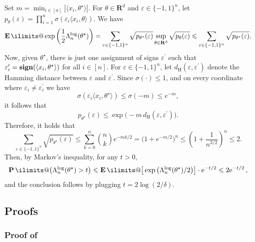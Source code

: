 \documentclass[11pt, letterpaper, hidelinks]{article}
\makeatletter
\renewcommand{\proofname}{\textit{\textbf{Proof}}}
\renewenvironment{proof}[1][\proofname]{\par\pushQED{\qed}\normalfont \topsep6\p@\@plus6\p@\relax\trivlist\item[\hskip\labelsep#1\@addpunct{}]\ignorespaces}{\popQED\endtrivlist\@endpefalse}
\newcommand{\R}{\mathbf R}
\newcommand{\e}{\mathrm{e}}
\DeclareMathOperator{\sign}{\bf sign}
\newcommand{\1}{\mathbf 1}
\newcommand{\eps}{\varepsilon}
\renewcommand{\le}{\leqslant}
\renewcommand{\leq}{\leqslant}
\newcommand{\E}{\operatorname*{\mathbf{E}}\ilimits@}
\renewcommand{\P}{\operatorname*{\mathbf{P}}\ilimits@}
\theoremstyle{plain}
\theoremstyle{definition}
\newcommand{\thetastar}{\theta^\star}
\newcommand{\defn}{=}
\makeatother
\begin{document}
\begin{proof}
Set
$
m \defn \min_{i\in[n]} |\langle x_i,\thetastar\rangle|.
$
For $\theta \in \R^d$ and $\eps \in \{-1,1\}^n$, let
$
p_\theta(\eps)
\defn
\prod_{i=1}^n \sigma(\eps_i \langle x_i,\theta\rangle).
$
We have
\[
\E\exp\left(\frac{1}{2}\Lambda_n^{\operatorname{log}}(\thetastar)\right)
=
\sum_{\varepsilon \in \{-1, 1\}^n}\sqrt{p_{\thetastar}(\eps)}
\sup_{\theta \in \R^d}\sqrt{p_\theta(\eps)}
\le
\sum_{\varepsilon \in \{-1, 1\}^n}\sqrt{p_{\thetastar}(\eps)}.
\]
Now, given $\thetastar$, there is just one assignment of signs $\varepsilon^\prime$
such that
$
\varepsilon^\prime_i = \sign(\langle x_i, \thetastar\rangle)$ for all $i \in [n]$.
For $\varepsilon \in \{-1, 1\}^n$, let
$
d_{\operatorname{H}}(\varepsilon, \varepsilon^\prime)
$
denote the Hamming distance between $\varepsilon$ and $\varepsilon^\prime$.
Since $\sigma(\cdot)\leq 1$, and on every coordinate where
$\varepsilon_i\neq \varepsilon_i^\prime$ we have
\[
\sigma(\varepsilon_i\langle x_i,\thetastar\rangle)\leq \sigma(-m)\leq e^{-m},
\]
it follows that
\[
p_{\thetastar}(\varepsilon)
\le
\exp\bigl(-m\,d_{\operatorname{H}}(\varepsilon,\varepsilon^\prime)\bigr).
\]
Therefore, it holds that
\[
\sum_{\varepsilon \in \{-1, 1\}^n}\sqrt{p_{\thetastar}(\eps)}
\le
\sum_{k=0}^n \binom{n}{k} e^{-mk/2}
=
\bigl(1+e^{-m/2}\bigr)^n
\le
\left(1 + \frac{1}{n^{3/2}}\right)^n
\leq 2.
\]
Then, by Markov's inequality, for any $t>0$,
\begin{equation}
\P\big(\Lambda_n^{\log}(\thetastar) > t\big)
	\leq \E\big[ \exp\big(\Lambda_n^{\log}(\thetastar)/2 \big)\big] \cdot \e^{-t/2}
	\leq 2 \e^{-t/2} \, ,
\end{equation}
and the conclusion follows by plugging $t=2\log(2/\delta)$.
\end{proof}


\subsection{Proofs}
\label{sec:main-remaining-proofs}

\subsubsection{Proof of~}
\label{sec:proof-strong-lower-bound-vandermonde}
\end{document}
